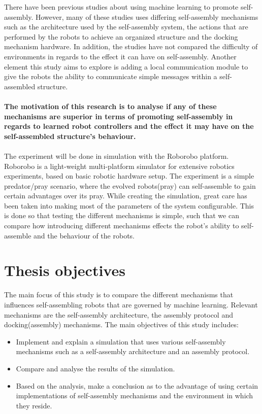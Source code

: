 There have been previous studies about using machine learning to promote self-assembly\cite{trianni_evolving_2004}\cite{montanier_adaptive_2014}\cite{li_co-evolution_2015}. 
However, many of these studies uses differing self-assembly mechanisms such as the architecture used by the self-assembly system, the actions that are performed by the robots to achieve an organized structure and the docking mechanism hardware.
In addition, the studies have not compared the difficulty of environments in regards to the effect it can have on self-assembly.
Another element this study aims to explore is adding a local communication module to give the robots the ability to communicate simple messages within a self-assembled structure.\\ \\
\textbf{The motivation of this research is to analyse if any of these mechanisms are superior in terms of promoting self-assembly in regards to learned robot controllers and the effect it may have on the self-assembled structure's behaviour.\\ \\}
The experiment will be done in simulation with the Roborobo platform. 
Roborobo is a light-weight multi-platform simulator for extensive robotics experiments, based on basic robotic hardware setup.
The experiment is a simple predator/pray scenario, where the evolved robots(pray) can self-assemble to gain certain advantages over its pray.
While creating the simulation, great care has been taken into making most of the parameters of the system configurable.
This is done so that testing the different mechanisms is simple, such that we can compare how introducing different mechanisms effects the robot's ability to self-assemble and the behaviour of the robots.

\section{Thesis objectives}
The main focus of this study is to compare the different mechanisms that influences self-assembling robots that are governed by machine learning. 
Relevant mechanisms are the self-assembly architecture, the assembly protocol and docking(assembly) mechanisms. 
The main objectives of this study includes:

\begin{itemize}

\item Implement and explain a simulation that uses various self-assembly mechanisms such as a self-assembly architecture and an assembly protocol.

\item Compare and analyse the results of the simulation. 

\item Based on the analysis, make a conclusion as to the advantage of using certain implementations of self-assembly mechanisms and the environment in which they reside.

\end{itemize}

